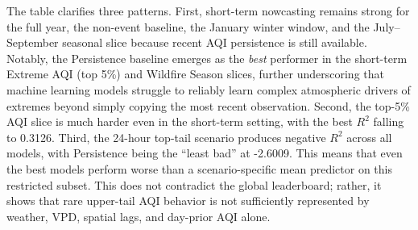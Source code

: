 \documentclass[11pt,a4paper]{article}
\begin{document}
\begin{table}[H]
\centering
\caption{Best-per-scenario results for extreme-event and climate-context evaluation on the 2025 test year.}
\label{tab:scenario-context-results}
\footnotesize
\setlength{\tabcolsep}{3pt}
\end{table}
\FloatBarrier

The table clarifies three patterns. First, short-term nowcasting remains strong for the full year, the non-event baseline, the January winter window, and the July--September seasonal slice because recent AQI persistence is still available. Notably, the Persistence baseline emerges as the \emph{best} performer in the short-term Extreme AQI (top 5\%) and Wildfire Season slices, further underscoring that machine learning models struggle to reliably learn complex atmospheric drivers of extremes beyond simply copying the most recent observation. Second, the top-5\% AQI slice is much harder even in the short-term setting, with the best $R^2$ falling to 0.3126. Third, the 24-hour top-tail scenario produces negative $R^2$ across all models, with Persistence being the ``least bad'' at -2.6009. This means that even the best models perform worse than a scenario-specific mean predictor on this restricted subset. This does not contradict the global leaderboard; rather, it shows that rare upper-tail AQI behavior is not sufficiently represented by weather, VPD, spatial lags, and day-prior AQI alone.
\end{document}
